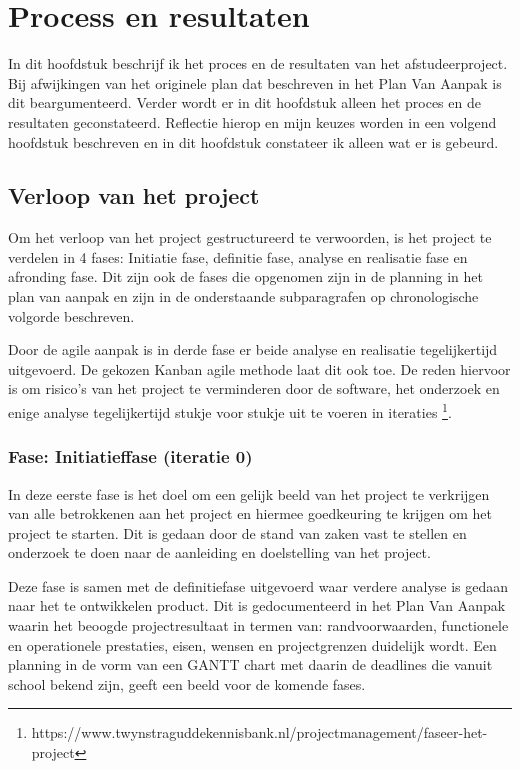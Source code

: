 \chapter{Process en resultaten}
In dit hoofdstuk beschrijf ik het proces en de resultaten van het afstudeerproject. Bij afwijkingen van het originele plan dat beschreven in het Plan Van Aanpak is dit beargumenteerd. Verder wordt er in dit hoofdstuk alleen het proces en de resultaten geconstateerd. Reflectie hierop en mijn keuzes worden in een volgend hoofdstuk beschreven en in dit hoofdstuk constateer ik alleen wat er is gebeurd.

\section{Verloop van het project}
Om het verloop van het project gestructureerd te verwoorden, is het project te verdelen in 4 fases: Initiatie fase, definitie fase, analyse en realisatie fase en afronding fase. Dit zijn ook de fases die opgenomen zijn in de planning in het plan van aanpak en zijn in de onderstaande subparagrafen op chronologische volgorde beschreven.\par

Door de agile aanpak is in derde fase er beide analyse en realisatie tegelijkertijd uitgevoerd.  De gekozen Kanban agile methode laat dit ook toe. De reden hiervoor is om risico’s van het project te verminderen door de software, het onderzoek en enige analyse tegelijkertijd stukje voor stukje uit te voeren in iteraties \footnote{https://www.twynstraguddekennisbank.nl/projectmanagement/faseer-het-project}.

\subsection{Fase: Initiatieffase (iteratie 0)}
In deze eerste fase is het doel om een gelijk beeld van het project te verkrijgen van alle betrokkenen aan het project en hiermee goedkeuring te krijgen om het project te starten. Dit is gedaan door de stand van zaken vast te stellen en onderzoek te doen naar de aanleiding en doelstelling van het project.\par

Deze fase is samen met de definitiefase uitgevoerd waar verdere analyse is gedaan naar het te ontwikkelen product. Dit is gedocumenteerd in het Plan Van Aanpak waarin het beoogde projectresultaat in termen van: randvoorwaarden, functionele en operationele prestaties, eisen, wensen en projectgrenzen duidelijk wordt. Een planning in de vorm van een GANTT chart met daarin de deadlines die vanuit school bekend zijn, geeft een beeld voor de komende fases.
\newpage

